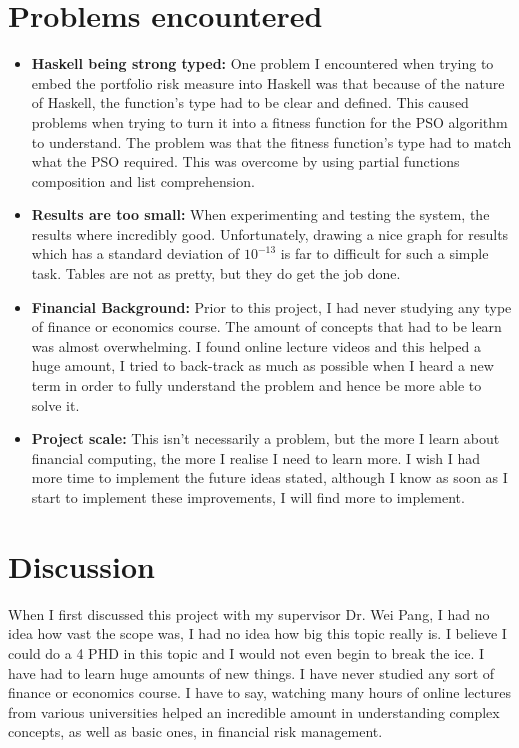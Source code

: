   \section{Problems encountered} %
  \label{sec:problems_encountered}
    \begin{itemize}
      \item \textbf{Haskell being strong typed:} One problem I encountered when trying to embed the portfolio risk measure into Haskell was that because of the nature of Haskell, the function's type had to be clear and defined. This caused problems when trying to turn it into a fitness function for the PSO algorithm to understand. The problem was that the fitness function's type had to match what the PSO required. This was overcome by using partial functions composition and list comprehension. 
      \item \textbf{Results are too small:} When experimenting and testing the system, the results where incredibly good. Unfortunately, drawing a nice graph for results which has a standard deviation of $10^{-13}$ is far to difficult for such a simple task. Tables are not as pretty, but they do get the job done. 
      \item \textbf{Financial Background:} Prior to this project, I had never studying any type of finance or economics course. The amount of concepts that had to be learn was almost overwhelming. I found online lecture videos and this helped a huge amount, I tried to back-track as much as possible when I heard a new term in order to fully understand the problem and hence be more able to solve it.
      \item \textbf{Project scale:} This isn't necessarily a problem, but the more I learn about financial computing, the more I realise I need to learn more. I wish I had more time to implement the future ideas stated, although I know as soon as I start to implement these improvements, I will find more to implement.
    \end{itemize}

  \section{Discussion} %
  \label{sec:discussion}
  When I first discussed this project with my supervisor Dr. Wei Pang, I had no idea how vast the scope was, I had no idea how big this topic really is. I believe I could do a 4 PHD in this topic and I would not even begin to break the ice. I have had to learn huge amounts of new things. I have never studied any sort of finance or economics course. I have to say, watching many hours of online lectures from various universities helped an incredible amount in understanding complex concepts, as well as basic ones, in financial risk management.

